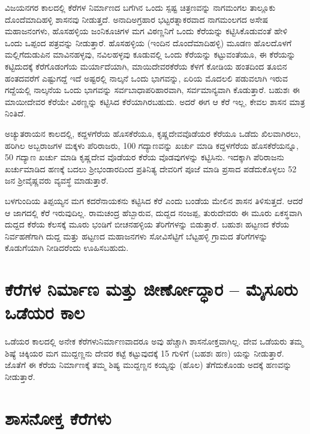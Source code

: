\newpage

ವಿಜಯನಗರ ಕಾಲದಲ್ಲಿ ಕೆರೆಗಳ ನಿರ್ಮಾಣದ ಬಗೆಗಿನ ಒಂದು ಸ್ಪಷ್ಟ ಚಿತ್ರಣವನ್ನು ನಾಗಮಂಗಲ ತಾಲ್ಲೂಕು ದೊಂದೆಮಾದಿಹಳ್ಳಿ ಶಾಸನವು ನೀಡುತ್ತದೆ. ಅನಾದಿಅಗ್ರಹಾರ ಭಟ್ಟರತ್ನಾಕರವಾದ ನಾಗಮಂಲಗದ ಅಸೇಷ ಮಹಾಜನಂಗಳು, ಹೊಸಹಳ್ಳಿಯ ಜಂನಿಕೂಚಿಗಳ ಮಗ ವಿಠಣ್ಣನಿಗೆ ಒಂದು ಕೆರೆಯನ್ನು ಕಟ್ಟಿಸಿಕೊಡುವಂತೆ ಹೇಳಿ ಒಂದು ಒಪ್ಪಂದ ಪತ್ರವನ್ನು ನೀಡುತ್ತಾರೆ. ಹೊಸಹಳ್ಳಿಯ (ಇಂದಿನ ದೊಂದೆಮಾದಿಹಳ್ಳಿ) ಮೂಡಣ ಹೊಲದೊಳಗೆ ಮಲ್ಲಿಗೆದುಡುಪಿನ ಮಾವಿನಹಳ್ಳವು, ನವಿಲಹಳ್ಳವು ಕೂಡುವಲ್ಲಿ ಒಂದು ಕೆರೆಯನ್ನು ಕಟ್ಟುವಂತೆಯೂ, ಈ ಕೆರೆಯನ್ನು ಕಟ್ಟಿದುದಕ್ಕೆ ಕೆರೆಗೊಡಂಗೆಯ ಮರ್ಯಾದೆಯಾಗಿ, ಮಾಯಿದೇವರಕೆರೆಯ ಕೆಳಗೆ ಕೋಡಿಯ ಹಂತದಿಂದ ತೂಬಿನ ಹಂತದವರೆಗೆ ಎಷ್ಟುಗದ್ದೆ ಇದೆ ಅಷ್ಟರಲ್ಲಿ ನಾಲ್ಕನೆ ಒಂದು ಭಾಗವನ್ನು, ಏರಿಯ ಮೊದಲಲಿ ಪಡುವಲಾಗಿ ಇರುವ ಗದ್ದೆಯಲ್ಲಿ ನಾಲ್ಕನೆಯ ಒಂದು ಭಾಗವನ್ನು ಸರ್ವಬಾಧಾಪರಿಹಾರವಾಗಿ, ಸರ್ವಮಾನ್ಯವಾಗಿ ಕೊಡುತ್ತಾರೆ. ಬಹುಶಃ ಈ ಮಾಯೀದೇವರ ಕೆರೆಯೇ ವಿಠಣ್ಣನ್ನು ಕಟ್ಟಿಸಿದ ಕೆರೆಯಾಗಿರಬಹುದು. ಅದರೆ ಈಗ ಆ ಕೆರೆ ಇಲ್ಲ, ಕೇವಲ ಶಾಸನ ಮಾತ್ರ ನಿಂತಿದೆ.

ಅಚ್ಯುತರಾಯನ ಕಾಲದಲ್ಲಿ, ಕದ್ದಳಗೆರೆಯ ಹೊಸಕೆರೆಯೂ, ಕೃಷ್ಣದೇವವೊಡೆಯರ ಕೆರೆಯೂ ಒಡೆದು ಖಿಲವಾಗಿ\-ರಲು, ಹರಿಗಿಲ ಅಬ್ಬರಾಜಗಳ ಮಕ್ಕಳು ಪೆರಿರಾಜರು, 100 ಗದ್ಯಾಣವನ್ನು ಖರ್ಚು ಮಾಡಿ ಕದ್ದಳಗೆರೆಯ ಹೊಸಕೆರೆಯನ್ನೂ, 50 ಗದ್ಯಾಣ ಖರ್ಚು ಮಾಡಿ ಕೃಷ್ಣದೇವ ವೊಡೆಯರ ಕೆರೆಯ ವೊಡವುಗಳನ್ನು ಕಟ್ಟಿಸಿನು. ಇದಕ್ಕಾಗಿ ಪೆರಿರಾಜನು ಖರ್ಚುಮಾಡಿದ ಹಣಕ್ಕೆ ಬದಲು ಶ‍್ರೀಭಂಡಾರದಿಂದ ಪ್ರತಿನಿತ್ಯ ದೇವರಿಗೆ ಪೂಜೆ ಮಾಡಿ ಪ್ರಸಾದ ಪಡೆದುಕೊಳ್ಳಲು 52 ಜನ ಶ‍್ರೀವೈಷ್ಣವರು ವ್ಯವಸ್ಥೆ ಮಾಡುತ್ತಾರೆ.

ಬಳಗುಂದಿಯ ತಿಪ್ಪಯ್ಯನ ಮಗ ಕದರೆನಾಯಕನು ಕಟ್ಟಿಸಿದ ಕೆರೆ ಎಂದು ಬಂಡೆಯ ಮೇಲಿನ ಶಾಸನ ತಿಳಿಸುತ್ತದೆ. ಆದರೆ ಆ ಜಾಗದಲ್ಲಿ ಕೆರೆ ಇರುವುದಿಲ್ಲ. ರಾಮಚಂದ್ರ ಹೆಬ್ಬಾರುವ, ದುದ್ದದ ನಂಜಪ್ಪ, ತುರುದೇವರು ಈ ಮೂರು ಏಕಸ್ಥವಾಗಿ ದುದ್ದದ ಕೆರೆಯ ಕೆಲಸಕ್ಕೆ ಮೂರು ಭಂಡಿಗೆ ಬೀಚನಹಳ್ಳಿಯ ತೆರಿಗೆಗಳನ್ನು ಬಿಡುತ್ತಾರೆ. ಬಹುಶಃ ಹಟ್ಟಣದ ಕೆರೆಯ ನಿರ್ವಹಣೆಗಾಗಿ ದುದ್ದ ಮತ್ತು ಹಟ್ಟಣದ ಮಹಾಜನಗಳು ಸೋವಿಸೆಟ್ಟಿಗೆ ಬೆಟ್ಟಹಳ್ಳಿ ಗ್ರಾಮದ ತೆರಿಗೆಗಳನ್ನು ಕೊಡುಗೆಯಾಗಿ ನೀಡಿದರೆಂದು ಊಹಿಸಬಹುದು.


\section{ಕೆರೆಗಳ ನಿರ್ಮಾಣ ಮತ್ತು ಜೀರ್ಣೋದ್ಧಾರ – ಮೈಸೂರು ಒಡೆಯರ ಕಾಲ}

ಒಡೆಯರ ಕಾಲದಲ್ಲಿ ಅನೇಕ ಕೆರೆಗಳುನಿರ್ಮಾಣವಾದರೂ ಅವು ಹೆಚ್ಚಾಗಿ ಶಾಸನೋಕ್ತವಾಗಿಲ್ಲ. ದೇವ ಒಡೆಯರು ತಮ್ಮ ಶಿಷ್ಯೆ ಚಿಕ್ಕಿಯರ ಮಗ ಮುದ್ದಣ್ಣನು ದೇವರ ಕಟ್ಟೆ ಕಟ್ಟುವುದಕ್ಕೆ 15 ಗುಳಿಗೆ (ಬಹಶಃ ಹಣ) ಯನ್ನು ನೀಡುತ್ತಾರೆ. ಜೊತೆಗೆ ಈ ಕೆರೆಯ ನಿರ್ಮಾಣಕ್ಕೆ ತಮ್ಮ ಶಿಷ್ಯ ಮುದ್ದಣ್ಣನ ಕಯ್ಯನ್ನು (ಹೊಲ) ತೆಗೆದುಕೊಂಡು ಅದಕ್ಕೆ ಹಣವನ್ನು ನೀಡುತ್ತಾರೆ.


\section{ಶಾಸನೋಕ್ತ ಕೆರೆಗಳು}

